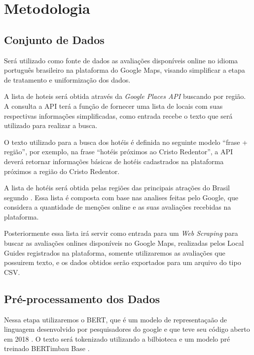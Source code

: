 \chapter{Metodologia}
\label{cap:metodologia}

\section{Conjunto de Dados}

Será utilizado como fonte de dados as avaliações disponíveis online no idioma português brasileiro na plataforma do Google Maps, visando simplificar a etapa de tratamento e uniformização dos dados.

A lista de hoteis será obtida através da \emph{Google Places API} buscando por região. A consulta a API terá a função de fornecer uma lista de locais com suas respectivas informações simplificadas, como entrada recebe o texto que será utilizado para realizar a busca.

O texto utilizado para a busca dos hotéis é definida no seguinte modelo “frase + região”, por exemplo, na frase “hotéis próximos ao Cristo Redentor”, a API deverá retornar informações básicas de hotéis cadastrados na plataforma próximos a região do Cristo Redentor.

A lista de hotéis será obtida pelas regiões das principais atrações do Brasil segundo \cite{googleFlights2022destinos}. Essa lista é composta com base nas analises feitas pelo Google, que considera a quantidade de menções online e as suas avaliações recebidas na plataforma.

Posteriormente essa lista irá servir como entrada para um \emph{Web Scraping} para buscar as avaliações onlines disponíveis no Google Maps, realizadas pelos Local Guides\cite{google2022localguides} registrados na plataforma, somente utilizaremos as avaliações que possuirem texto, e os dados obtidos serão exportados para um arquivo do tipo CSV.

\section{Pré-processamento dos Dados}

Nessa etapa utilizaremos o BERT, que é um modelo de representaçaão de linguagem desenvolvido por pesquisadores do google e que teve seu código aberto em 2018 \cite{hugoZanini2021mediu}. O texto será tokenizado utilizando a bilbioteca e um modelo pré treinado BERTimbau Base \cite{souza2020bertimbau}.

